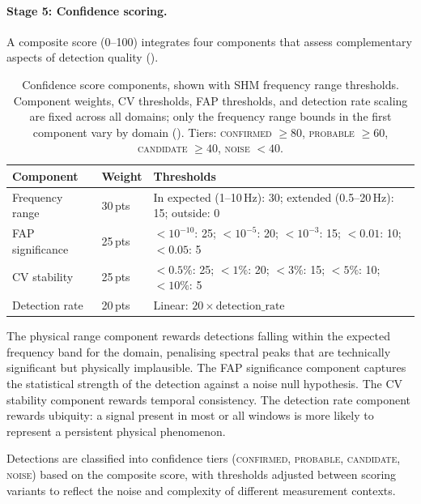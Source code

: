\documentclass[11pt,a4paper]{article}
\begin{document}
\paragraph{Stage 5: Confidence scoring.} A composite score (0--100) integrates four components that assess complementary aspects of detection quality ().

\begin{table}[htbp]
\centering
\caption{Confidence score components, shown with SHM frequency range thresholds. Component weights, CV thresholds, FAP thresholds, and detection rate scaling are fixed across all domains; only the frequency range bounds in the first component vary by domain (). Tiers: \textsc{confirmed} $\geq 80$, \textsc{probable} $\geq 60$, \textsc{candidate} $\geq 40$, \textsc{noise} $< 40$.}
\label{tab:confidence}
\smallskip
\begin{tabular}{lll}
\toprule
\textbf{Component} & \textbf{Weight} & \textbf{Thresholds} \\
\midrule
Frequency range   & 30\,pts & In expected (1--10\,Hz): 30; extended (0.5--20\,Hz): 15; outside: 0 \\
FAP significance  & 25\,pts & $<10^{-10}$: 25; $<10^{-5}$: 20; $<10^{-3}$: 15; $<0.01$: 10; $<0.05$: 5 \\
CV stability      & 25\,pts & $<0.5\%$: 25; $<1\%$: 20; $<3\%$: 15; $<5\%$: 10; $<10\%$: 5 \\
Detection rate    & 20\,pts & Linear: $20 \times \text{detection\_rate}$ \\
\bottomrule
\end{tabular}
\end{table}

The physical range component rewards detections falling within the expected frequency band for the domain, penalising spectral peaks that are technically significant but physically implausible. The FAP significance component captures the statistical strength of the detection against a noise null hypothesis. The CV stability component rewards temporal consistency. The detection rate component rewards ubiquity: a signal present in most or all windows is more likely to represent a persistent physical phenomenon.

Detections are classified into confidence tiers (\textsc{confirmed}, \textsc{probable}, \textsc{candidate}, \textsc{noise}) based on the composite score, with thresholds adjusted between scoring variants to reflect the noise and complexity of different measurement contexts.
\end{document}
